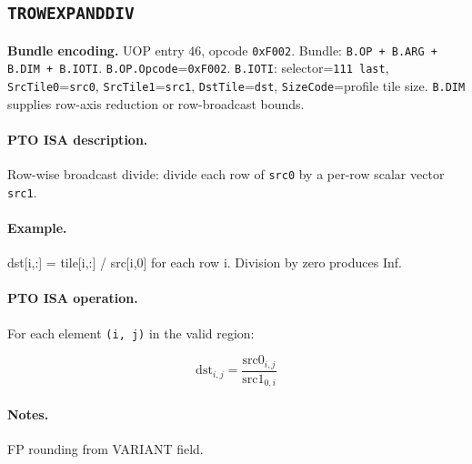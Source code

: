 \subsection{\texttt{TROWEXPANDDIV}}
\noindent\textbf{Bundle encoding.} UOP entry 46, opcode \texttt{0xF002}. Bundle: \texttt{B.OP + B.ARG + B.DIM + B.IOTI}. \texttt{B.OP.Opcode}=\texttt{0xF002}. \texttt{B.IOTI}: selector=\texttt{111 last}, \texttt{SrcTile0}=\texttt{src0}, \texttt{SrcTile1}=\texttt{src1}, \texttt{DstTile}=\texttt{dst}, \texttt{SizeCode}=profile tile size. \texttt{B.DIM} supplies row-axis reduction or row-broadcast bounds.\par\smallskip
{\small
\paragraph{PTO ISA description.}
Row-wise broadcast divide: divide each row of \texttt{src0} by a per-row scalar vector \texttt{src1}.
\paragraph{Example.}
dst[i,:] = tile[i,:] / src[i,0] for each row i. Division by zero produces Inf.
\par\smallskip
\paragraph{PTO ISA operation.}
For each element \texttt{(i, j)} in the valid region:

\[
\mathrm{dst}_{i,j} = \frac{\mathrm{src0}_{i,j}}{\mathrm{src1}_{0,i}}
\]
}\par\smallskip
\paragraph{Notes.}
FP rounding from VARIANT field.
